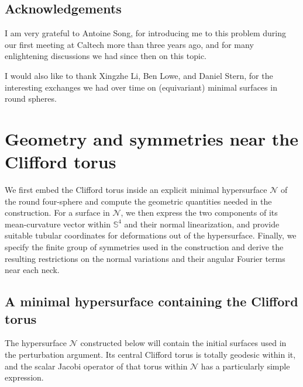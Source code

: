 \documentclass[a4paper,11pt,oneside,reqno]{amsart}
\numberwithin{equation}{section}
\theoremstyle{definition}
\begin{document}
\subsection*{Acknowledgements}
I am very grateful to Antoine Song, for introducing me to this problem during our first meeting at Caltech more than three years ago, and for many enlightening discussions we had since then on this topic.

I would also like to thank Xingzhe Li, Ben Lowe, and Daniel Stern, for the interesting exchanges we had over time on (equivariant) minimal surfaces in round spheres.
\par
\endgroup
%

\section{Geometry and symmetries near the Clifford torus}
\label{sec:s4-geometry}

We first embed the Clifford torus inside an explicit minimal
hypersurface $\mathcal{N}$ of the round four-sphere and compute the geometric quantities needed in the construction. For a surface in $\mathcal{N}$, we then express the two components of its mean-curvature vector within $\mathbb{S}^4$ and their normal linearization, and provide suitable tubular coordinates for deformations out of the hypersurface. Finally, we specify the finite group of symmetries used in the construction and derive the resulting restrictions on the normal variations and their angular Fourier terms near each neck.

\subsection{A minimal hypersurface containing the Clifford torus}

The hypersurface $\mathcal{N}$ constructed below will contain the initial surfaces used in the perturbation argument. Its central Clifford torus is totally geodesic within it, and the scalar Jacobi operator of that torus within $\mathcal{N}$ has a particularly simple expression.
\end{document}
